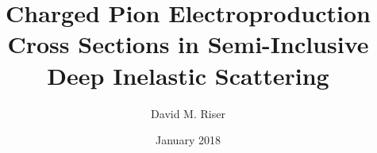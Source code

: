 \title{Charged Pion Electroproduction Cross Sections in Semi-Inclusive Deep Inelastic Scattering}
\author{David M. Riser}
\date{January 2018}

